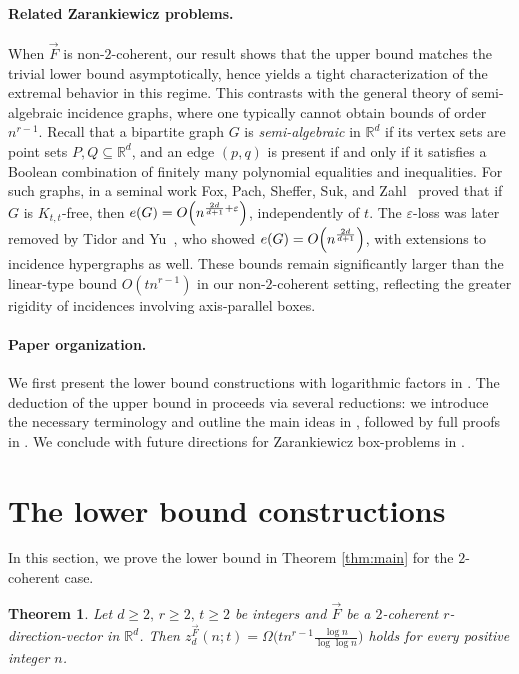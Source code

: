 \documentclass[11pt]{article}
\newtheorem{theorem}{Theorem}[section]
\theoremstyle{definition}
\newcommand*{\veps}{\varepsilon}                                %
\newcommand*{\R}{\mathbb{R}}                                    %
\newcommand*{\vF}{\vec{F}}
\begin{document}
\paragraph{Related Zarankiewicz problems.}
When $\vF$ is non-$2$-coherent, our result shows that the upper bound matches the trivial lower bound asymptotically, hence yields a tight characterization of the extremal behavior in this regime. This contrasts with the general theory of semi-algebraic incidence graphs, where one typically cannot obtain bounds of order $n^{r-1}$. Recall that a bipartite graph $G$ is \emph{semi-algebraic} in $\R^d$ if its vertex sets are point sets $P, Q \subseteq \R^d$, and an edge $(p, q)$ is present if and only if it satisfies a Boolean combination of finitely many polynomial equalities and inequalities. For such graphs, in a seminal work Fox, Pach, Sheffer, Suk, and Zahl~\cite{fox_pach_sheffer_suk_zahl} proved that if $G$ is $K_{t, t}$-free, then $e(G) = O \Bigl( n^{\frac{2d}{d+1} + \veps} \Bigr)$, independently of $t$. The $\varepsilon$-loss was later removed by Tidor and Yu~\cite{tidor_yu}, who showed $e(G) = O \Bigl( n^{\frac{2d}{d+1}} \Bigr)$, with extensions to incidence hypergraphs as well. These bounds remain significantly larger than the linear-type bound $O(tn^{r-1})$ in our non-$2$-coherent setting, reflecting the greater rigidity of incidences involving axis-parallel boxes. 

\paragraph{Paper organization.} We first present the lower bound constructions with logarithmic factors in . The deduction of the upper bound in  proceeds via several reductions: we introduce the necessary terminology and outline the main ideas in , followed by full proofs in . We conclude with future directions for Zarankiewicz box-problems in . 

\section{The lower bound constructions} \label{sec:lower_proof}

In this section, we prove the lower bound in Theorem \ref{thm:main} for the $2$-coherent case. 

\begin{theorem} \label{thm:lower}
    Let $d \ge 2, \, r \ge 2, \, t \ge 2$ be integers and $\vF$ be a $2$-coherent $r$-direction-vector in $\R^d$. Then $z_d^{\vF}(n; t) = \Omega \bigl( tn^{r-1} \frac{\log n}{\log\log n} \bigr)$ holds for every positive integer $n$. 
\end{theorem}
\end{document}
